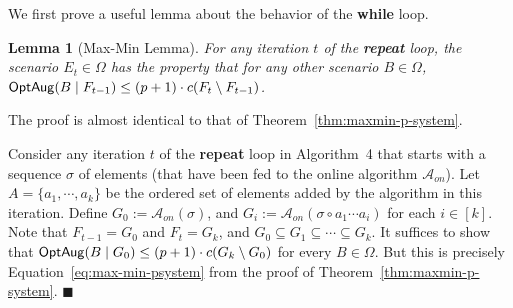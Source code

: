 \documentclass[11pt,letterpaper]{article}
\newcommand{\ignore}[1]{}
\newtheorem{lemma}[theorem]{Lemma}
\newenvironment{proof}{

\noindent{\bf Proof:}} {\hfill$\blacksquare$


}
\def\a{\ensuremath{\mathcal{A}}\xspace}
\newcommand{\sse}{\subseteq}
\newcommand{\optaug}{{\sf OptAug}}
\begin{document}
We first prove a useful lemma about the behavior of the \textbf{while} loop. \ignore{ though it does not return a
scenario whose cost of augmentation with respect to the current solution is the largest possible, the loop does give a
scenario which is not much worse. This key lemma is proved in the next subsection.}
\begin{lemma}[Max-Min Lemma]
  \label{lem:maxmin}
  For any iteration $t$ of the {\bf repeat} loop, the scenario $E_t \in \Omega$ has the property that for any
  other scenario $B \in \Omega$, $\optaug(B\mid F_{t-1}) \le (p+1)\cdot c(F_t\setminus F_{t-1})$.
\end{lemma}
\begin{proof}
The proof is almost identical to that of Theorem~\ref{thm:maxmin-p-system}.

Consider any iteration $t$ of the {\bf repeat} loop in  Algorithm~4  that starts with a sequence $\sigma$  of elements
(that have been fed to the online algorithm
  $\a_{on}$). Let $A=\{a_1,\cdots,a_k\}$ be the ordered set of elements
  added by the algorithm in this iteration. Define
  $G_0:=\a_{on}(\sigma)$, and $G_i:=\a_{on}(\sigma \circ a_1\cdots a_i)$
  for each $i\in[k]$. Note that $F_{t-1}=G_0$ and $F_t=G_k$, and
  $G_0\sse G_1\sse\cdots\sse G_k$. It suffices to show that
  $\optaug(B\mid G_0)\le (p+1)\cdot c(G_k\setminus G_0)$ for every
  $B\in\Omega$. But this is precisely Equation~\eqref{eq:max-min-psystem} from the proof of Theorem~\ref{thm:maxmin-p-system}.
\end{proof}
\end{document}
